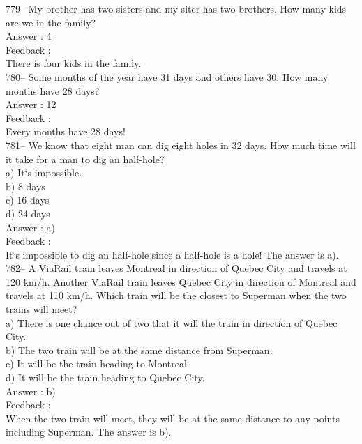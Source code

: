 \documentclass[letterpaper, 12pt]{article}
\begin{document}
779-- My brother has two sisters and my siter has two brothers. How many kids are we in the family?\\

Answer : 4\\

Feedback : \\
There is four kids in the family.\\

780-- Some months of the year have 31 days and others have 30.
How many months have 28 days?\\

Answer : 12\\

Feedback : \\
Every months have 28 days! \\

781-- We know that eight man can dig eight holes in 32 days.
How much time will it take for a man to dig an half-hole?\\
a) It`s impossible.\\
b) 8 days\\
c) 16 days\\
d) 24 days\\

Answer : a)\\

Feedback : \\
It`s impossible to dig an half-hole since a half-hole is a hole! The answer is a).\\

782-- A ViaRail train leaves Montreal in direction of Quebec City and travels at 120 km/h. Another ViaRail train leaves Quebec City in direction of Montreal and travels at 110 km/h.  Which train will be the closest to Superman when the two trains will meet?\\

a) There is one chance out of two that it will the train in direction of Quebec City.\\
b) The two train will be at the same distance from Superman.\\
c) It will be the train heading to Montreal.\\
d) It will be the train heading to Quebec City.\\

Answer : b)\\

Feedback : \\
When the two train will meet, they will be at the same distance to any points including Superman.  The answer is b).\\
\end{document}
